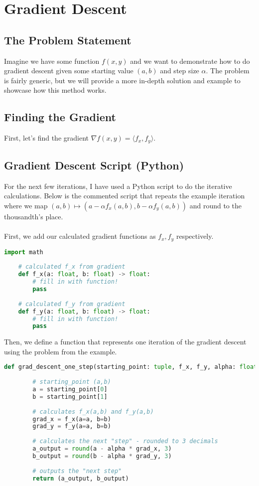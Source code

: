 
\section{Gradient Descent}
\subsection{The Problem Statement}
Imagine we have some function $f(x,y)$ and we want to demonstrate how to do gradient descent given some starting value $(a,b)$ and step size $\alpha$. The problem is fairly generic, but we will provide a more in-depth solution and example to showcase how this method works.
\subsection{Finding the Gradient}
First, let's find the gradient $\nabla f(x,y) = \langle f_x, f_y \rangle$.

\subsection{Gradient Descent Script (Python)}
For the next few iterations, I have used a Python script to do the iterative calculations. Below is the commented script that repeats the example iteration where we map $(a,b) \mapsto \left(a - \alpha f_x(a,b), b - \alpha f_y(a,b)\right)$ and round to the thousandth's place. \\
\\
First, we add our calculated gradient functions as $f_x, f_y$ respectively. 
\begin{lstlisting}[language=Python]
    import math
    
    # calculated f_x from gradient
    def f_x(a: float, b: float) -> float:
        # fill in with function!
        pass
    
    # calculated f_y from gradient
    def f_y(a: float, b: float) -> float:
        # fill in with function!
        pass

\end{lstlisting}
Then, we define a function that represents one iteration of the gradient descent using the problem from the example.
\begin{lstlisting}[language=Python]
    def grad_descent_one_step(starting_point: tuple, f_x, f_y, alpha: float):
    
        # starting_point (a,b)
        a = starting_point[0]
        b = starting_point[1]
    
        # calculates f_x(a,b) and f_y(a,b)
        grad_x = f_x(a=a, b=b)
        grad_y = f_y(a=a, b=b)
    
        # calculates the next "step" - rounded to 3 decimals
        a_output = round(a - alpha * grad_x, 3)
        b_output = round(b - alpha * grad_y, 3)
    
        # outputs the "next step"
        return (a_output, b_output)
\end{lstlisting}

